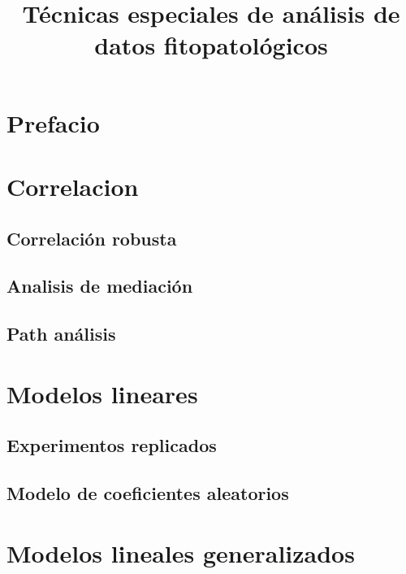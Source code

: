 \documentclass[]{book}
\title{Técnicas especiales de análisis de datos fitopatológicos}
\author{}
\date{}
\begin{document}
\maketitle

{
\setcounter{tocdepth}{1}
\tableofcontents
}
\hypertarget{prefacio}{%
\chapter*{Prefacio}\label{prefacio}}

\hypertarget{corr}{%
\chapter{Correlacion}\label{corr}}

\hypertarget{correlacion-robusta}{%
\section{Correlación robusta}\label{correlacion-robusta}}

\hypertarget{analisis-de-mediacion}{%
\section{Analisis de mediación}\label{analisis-de-mediacion}}

\hypertarget{path-analisis}{%
\section{Path análisis}\label{path-analisis}}

\hypertarget{lm}{%
\chapter{Modelos lineares}\label{lm}}

\hypertarget{experimentos-replicados}{%
\section{Experimentos replicados}\label{experimentos-replicados}}

\hypertarget{modelo-de-coeficientes-aleatorios}{%
\section{Modelo de coeficientes
aleatorios}\label{modelo-de-coeficientes-aleatorios}}

\hypertarget{glm}{%
\chapter{Modelos lineales generalizados}\label{glm}}
\end{document}
